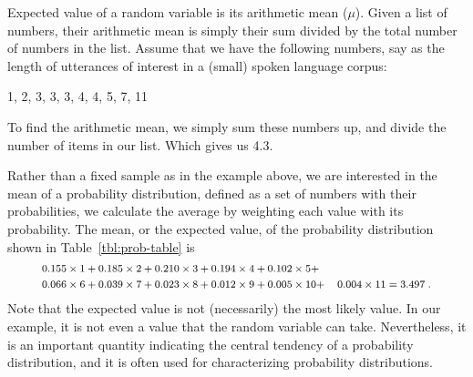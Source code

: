 Expected value of a random variable is its arithmetic mean ($\mu$).
Given a list of numbers,
their arithmetic mean is simply their sum divided
by the total number of numbers in the list.
Assume that we have the following numbers,
say as the length of utterances of interest
in a (small) spoken language corpus:
\begin{center}
  \num{1},
  \num{2},
  \num{3}, \num{3}, \num{3},
  \num{4}, \num{4},
  \num{5},
  \num{7},
  \num{11}
\end{center}
To find the arithmetic mean,
we simply sum these numbers up, and divide the number of items in our list.
Which gives us \num[round-precision=1]{4.3}. 
\begin{marginfigure}
  \caption{\label{fig:hist-mean}%
    A graphical representation (histogram) of the distribution of the  numbers in the example.
    Dashed orange line marks the mean.
  }
\end{marginfigure}

Rather than a fixed sample as in the example above,
we are interested in the mean of a probability distribution,
defined as a set of numbers with their probabilities,
we calculate the average by weighting each value with its probability.
The mean, or the expected value,
of the probability distribution shown in Table~\ref{tbl:prob-table} is
\begin{equation}
  \footnotesize
  \label{eqn:example-exp-val}
  \begin{aligned}
   & 0.155 \times 1 +
    0.185 \times 2 +
    0.210 \times 3 +
    0.194 \times 4 +
    0.102 \times 5 +&\\
   & 0.066 \times 6 +
    0.039 \times 7 +
    0.023 \times 8 +
    0.012 \times 9 +
    0.005 \times 10 +&
    0.004 \times 11 = 3.497\;.\\
  \end{aligned}
\end{equation}
Note that the expected value is not (necessarily) the most likely value.
In our example,
it is not even a value that the random variable can take.
Nevertheless, it is an important quantity
indicating the central tendency of a probability distribution,
and it is often used for characterizing probability distributions.


